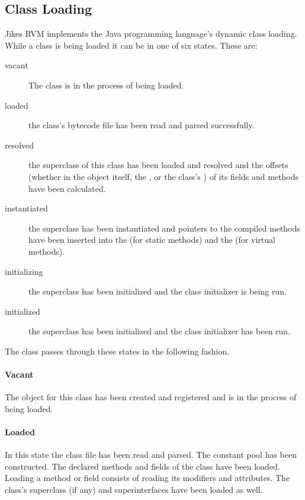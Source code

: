 \subsection{Class Loading} \label{sssec:classLoading}

Jikes\TMweb{} RVM implements the Java\TMweb{} programming
language's dynamic class loading.  While a class is being loaded it can
be in one of six states. These are:
\begin{description}
\item[vacant] The class is in the process of being loaded.
\item[loaded] the class's bytecode file has been read and parsed successfully.
\item[resolved] the superclass of this class has been loaded and resolved and
the offsets (whether in the object itself, the , or the class's
) of its fields and methods have been calculated.
\item[instantiated] the superclass has been instantiated and pointers to the
compiled methods have been inserted into the  (for static methods) and the
 (for virtual methods).
\item[initializing] the superclass has been initialized and the class
initializer is being run.
\item[initialized] the superclass has been initialized and the class
initializer has been run.
\end{description}

The class passes through these states in the following fashion.

\paragraph{Vacant}
The 
object for this class has been created and registered and is in the
process of being loaded.

\paragraph{Loaded} 
In this state the class file has been read and parsed.  The constant
pool has been constructed. The declared methods and fields of the
class have been loaded.  Loading a method or field consists of reading
its modifiers and attributes. The class's superclass (if any) and
superinterfaces have been loaded as well.

